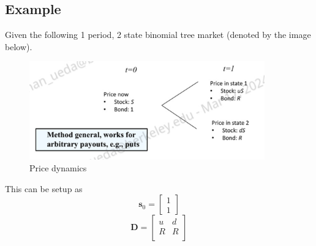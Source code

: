 \documentclass[11pt]{article}
\begin{document}
\subsection{Example}

Given the following 1 period, 2 state binomial tree market (denoted by the image below).

\begin{figure}[H] 
    \centering 
    \includegraphics[width=4in]{imgs/one_period_two_state_bin_tree_model.png}
    \caption{Price dynamics}
\end{figure}

This can be setup as 
    \[
    \boldsymbol{s}_0 = \begin{bmatrix}
        1 \\ 
        1
    \end{bmatrix}
    \]
    \[ 
    \boldsymbol{D} = \begin{bmatrix}
        u & d \\
        R & R \\
    \end{bmatrix}
    \]
\end{document}
